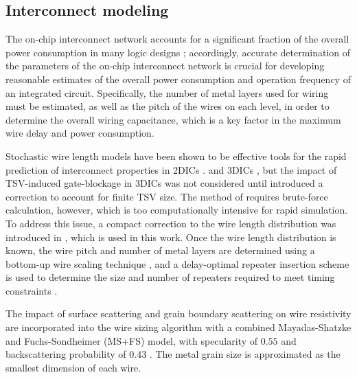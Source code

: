 \documentclass[journal,twoside]{IEEEtran}
\newcommand{\changed}[1]{\textcolor{red}{#1}}
\renewcommand{\changed}[1]{#1} %
\begin{document}
\subsection{Interconnect modeling} \label{s-interconnect-modeling}
\changed{The on-chip interconnect network accounts for a significant fraction of the overall
power consumption in many logic designs \cite{sekar_intsim_2007}; accordingly, accurate determination of
the parameters of the on-chip interconnect network is crucial for developing reasonable estimates of
the overall power consumption and operation frequency of an integrated circuit. Specifically,
the number of metal layers used for wiring must be estimated, as well as the pitch of the wires on each level,
in order to determine the overall wiring capacitance, which is a key factor in the maximum wire delay and power consumption.}

Stochastic wire length models have been shown to be effective tools for the rapid prediction
of interconnect properties in 2DICs
\cite{davis_stochastic_1998,sekar_intsim_2007}.
and 3DICs
\cite{joyner_impact_2001},
but the impact of TSV-induced gate-blockage in 3DICs was not considered until \cite{kim_through-silicon-via_2009-1}
introduced a correction to account for finite TSV size. The method of \cite{kim_through-silicon-via_2009-1}
requires brute-force calculation, however, which is too computationally intensive for rapid simulation. 
To address this issue, a compact correction to the 
wire length distribution was introduced in \cite{wahby_wld_2013}, which is used in this work.
Once the wire length distribution is known, the wire pitch and number of metal layers are determined using a bottom-up wire scaling 
technique \cite{venkatesan-optimal-2001}, and a delay-optimal repeater insertion scheme 
is used to determine the size and number of repeaters required to meet timing constraints \cite{bakoglu_optimal_1985}.

The impact of surface scattering and grain boundary scattering on wire resistivity are incorporated into the wire sizing algorithm
with a combined Mayadas-Shatzke and Fuchs-Sondheimer (MS+FS) model, with
specularity of $0.55$ and backscattering probability of $0.43$ \cite{sun_surface_2010}.
The metal grain size is approximated as the smallest dimension of each wire.


\end{document}
